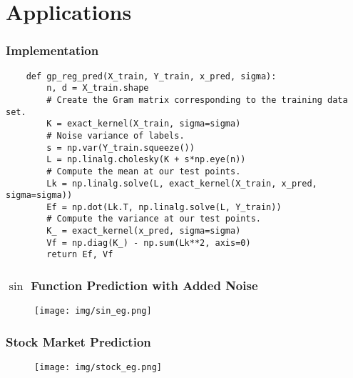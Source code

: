 \documentclass[9pt,hyperref={pdfpagelabels=false},xcolor=table]{beamer}
\begin{document}
\section{Applications}

\begin{frame}[fragile]
    \frametitle{Implementation}

    \begin{verbatim}
    def gp_reg_pred(X_train, Y_train, x_pred, sigma):
        n, d = X_train.shape
        # Create the Gram matrix corresponding to the training data set.
        K = exact_kernel(X_train, sigma=sigma)
        # Noise variance of labels.
        s = np.var(Y_train.squeeze())
        L = np.linalg.cholesky(K + s*np.eye(n))
        # Compute the mean at our test points.
        Lk = np.linalg.solve(L, exact_kernel(X_train, x_pred, sigma=sigma))
        Ef = np.dot(Lk.T, np.linalg.solve(L, Y_train))
        # Compute the variance at our test points.
        K_ = exact_kernel(x_pred, sigma=sigma)
        Vf = np.diag(K_) - np.sum(Lk**2, axis=0)
        return Ef, Vf
    \end{verbatim}

\end{frame}

\begin{frame}
    \frametitle{$\sin$ Function Prediction with Added Noise}

    \begin{figure}
        \centering
        \begin{adjustbox}{width=0.9\textwidth}
            \texttt{[image: img/sin\_eg.png]}
        \end{adjustbox}
    \end{figure}
\end{frame}

\begin{frame}
    \frametitle{Stock Market Prediction}

    \begin{figure}
        \centering
        \begin{adjustbox}{width=0.9\textwidth}
            \texttt{[image: img/stock\_eg.png]}
        \end{adjustbox}
    \end{figure}
\end{frame}
\end{document}
